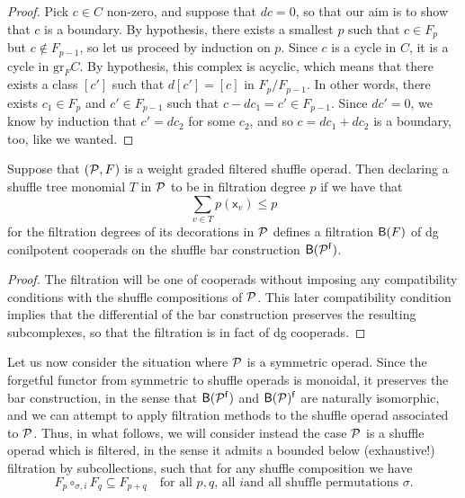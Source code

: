   \begin{proof}
  Pick $c\in C$ non-zero, 
  and suppose that $dc=0$,
  so that our aim is to show that $c$ is a boundary.
  By hypothesis, there exists a smallest $p$
  such that $c\in F_p$ but $c\notin F_{p-1}$,
  so let us proceed by induction on $p$.
  Since $c$ is a cycle in $C$, it is a cycle
  in $\mathrm{gr}_F C$. 
  By hypothesis, this complex is acyclic, 
  which means that there exists a class $[c']$
  such that $d[c'] = [c]$ in $F_p/F_{p-1}$. In
  other words, there exists $c_1\in F_p$ and
  $c'\in F_{p-1}$ such that
  $c- dc_1 = c'\in F_{p-1}$.
 Since $dc' = 0$, we know by induction that $c'=dc_2$
 for some $c_2$, and so $c = dc_1+dc_2$ is a
 boundary, too, like we wanted.
  \end{proof}
  
  \begin{example}
  \end{example}
  
  

 
 \begin{lemma}
 Suppose that $({\mathcal{P}},F)$ is a
 weight graded filtered shuffle operad.
 Then declaring a shuffle tree monomial $T$ in ${\mathcal{P}}$
 to be in filtration degree $p$ if we have that
 \[\sum_{v\in T} p(\mathsf{x}_v) \leqslant p \]
 for the filtration degrees of its decorations
 in ${\mathcal{P}}$ defines a filtration $\mathsf{B}(F)$ 
 of dg conilpotent
 cooperads on the shuffle bar construction
 $\mathsf{B}({\mathcal{P}}^{\mathsf{f}})$.
 \end{lemma}
 
 \begin{proof}
 The filtration will be one of cooperads without
 imposing any compatibility conditions with the
 shuffle compositions of ${\mathcal{P}}$. This
 later compatibility condition implies that
 the differential of the bar construction
 preserves the resulting subcomplexes,
 so that the filtration is in fact of dg
 cooperads.  \end{proof}
 
  Let us now consider the situation where ${\mathcal{P}}$
 is a symmetric operad. Since the forgetful
 functor from symmetric to shuffle operads is
 monoidal, it preserves the bar construction,
 in the sense that $\mathsf{B}({\mathcal{P}}^{\mathsf{f}})$ and
 $\mathsf{B}({\mathcal{P}})^{\mathsf{f}}$ are naturally isomorphic,
 and we can attempt to apply filtration methods
 to the shuffle operad associated to ${\mathcal{P}}$.
 Thus, in what follows, we will consider instead
 the case ${\mathcal{P}}$ is a shuffle operad which is
 filtered, in the sense it admits a bounded
 below (exhaustive!) filtration by subcollections,
 such that for any shuffle composition we have
 \[
 F_p \circ_{\sigma,i} F_q \subseteq
  F_{p+q}\quad\text{for all $p,q$, all $i$
  and all shuffle permutations $\sigma$.}
 \]
 
